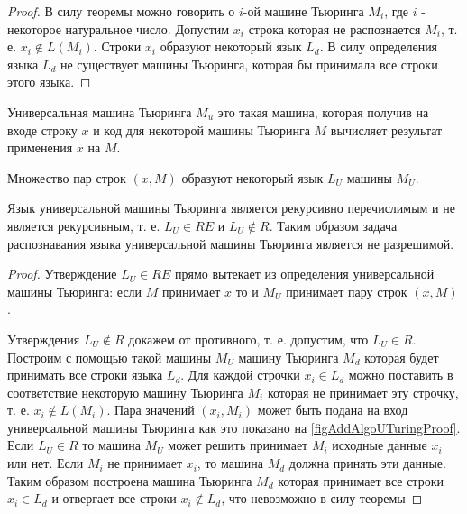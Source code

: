 \begin{proof}
В силу теоремы  можно говорить о
$i$-ой машине Тьюринга $M_i$, где $i$ - некоторое натуральное
число. Допустим $x_i$ строка которая не распознается $M_i$, т. е. 
$x_i \notin L\left(M_i\right)$. Строки $x_i$ образуют некоторый язык
$L_d$. В силу определения языка $L_d$ не существует машины Тьюринга,
которая бы принимала все строки этого языка.
\end{proof}

\begin{definition}
Универсальная машина Тьюринга $M_u$ это такая машина, которая получив
на входе строку $x$ и код для некоторой машины Тьюринга $M$ вычисляет
результат применения $x$ на $M$.
\end{definition}



Множество пар строк $\left(x, M\right)$ образуют некоторый язык $L_U$ машины
$M_U$. 



\begin{theorem}

Язык универсальной машины Тьюринга является рекурсивно перечислимым и
не является рекурсивным, т. е. $L_U \in RE$ и $L_U \notin R$. Таким
образом задача распознавания языка универсальной машины Тьюринга
является не разрешимой.
\label{theoremAddAlgoTuringUniversalMachine}
\end{theorem}

\begin{proof}
Утверждение $L_U \in RE$ прямо вытекает из определения универсальной
машины Тьюринга: если $M$ принимает $x$ то и $M_U$ принимает пару
строк $\left(x, M\right)$.

Утверждения $L_U \notin R$ докажем от противного, т. е. допустим, что
$L_U \in R$. Построим с помощью такой машины $M_U$ машину Тьюринга
$M_d$ которая будет принимать все строки языка $L_d$. Для каждой строчки
$x_i \in L_d$ можно поставить в соответствие некоторую машину Тьюринга
$M_i$ которая не принимает эту строчку, т. е. $x_i \notin
L\left(M_i\right)$. Пара значений $\left(x_i, M_i\right)$ может быть
подана на вход универсальной машины Тьюринга как это показано на 
\autoref{figAddAlgoUTuringProof}. Если $L_U \in R$ то машина $M_U$ может
решить принимает $M_i$ исходные данные $x_i$ или нет. Если $M_i$ не
принимает $x_i$, то машина $M_d$ должна принять эти данные. Таким
образом построена машина Тьюринга $M_d$ которая принимает все строки
$x_i \in L_d$ и отвергает все строки $x_i \notin L_d$, что невозможно
в силу теоремы 
\end{proof}

